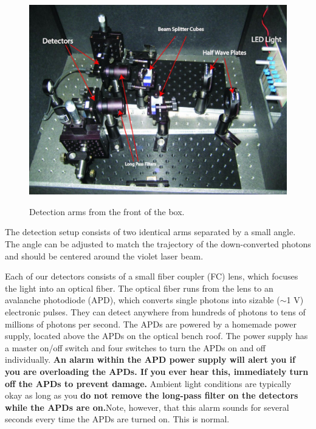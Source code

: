 \documentclass{../lab}
\begin{document}
\begin{figure}[h]
    \centering
    \href{http://experimentationlab.berkeley.edu/sites/default/files/images/IMG_4032.jpg}{\includegraphics[width=0.5\linewidth]{images/IMG_4032.jpg}}
    \caption{Detection arms from the front of the box.}
    \label{fig:IMG_4032}
\end{figure}

The detection setup consists of two identical arms separated by a small angle. The angle can be adjusted to match the trajectory of the down-converted photons and should be centered around the violet laser beam.

Each of our detectors consists of a small fiber coupler (FC) lens, which focuses the light into an optical fiber. The optical fiber runs from the lens to an avalanche photodiode (APD), which converts single photons into sizable ($\sim$1 V) electronic pulses. They can detect anywhere from hundreds of photons to tens of millions of photons per second. The APDs are powered by a homemade power supply, located above the APDs on the optical bench roof. The power supply has a master on/off switch and four switches to turn the APDs on and off individually. \textbf{An alarm within the APD power supply will alert you if you are overloading the APDs. If you ever hear this, immediately turn off the APDs to prevent damage.} Ambient light conditions are typically okay as long as you \textbf{do not remove the long-pass filter on the detectors while the APDs are on.}Note, however, that this alarm sounds for several seconds every time the APDs are turned on. This is normal.
\end{document}

